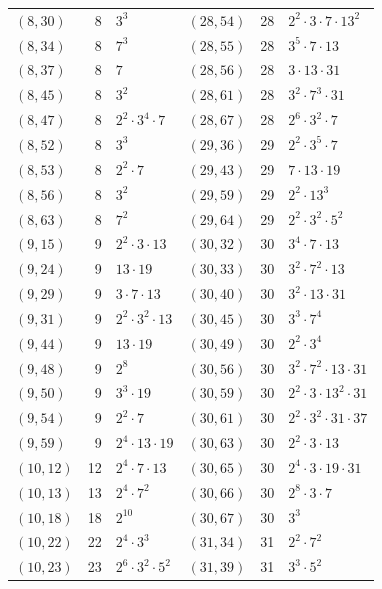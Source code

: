 \documentclass[11pt]{article}
\begin{document}
\begin{longtable}{@{}lrl@{\qquad}lrl@{}}
$(8,30)$ & 8 & $3^{3}$ & $(28,54)$ & 28 & $2^{2}\cdot 3\cdot 7\cdot 13^{2}$\\
$(8,34)$ & 8 & $7^{3}$ & $(28,55)$ & 28 & $3^{5}\cdot 7\cdot 13$\\
$(8,37)$ & 8 & $7$ & $(28,56)$ & 28 & $3\cdot 13\cdot 31$\\
$(8,45)$ & 8 & $3^{2}$ & $(28,61)$ & 28 & $3^{2}\cdot 7^{3}\cdot 31$\\
$(8,47)$ & 8 & $2^{2}\cdot 3^{4}\cdot 7$ & $(28,67)$ & 28 & $2^{6}\cdot 3^{2}\cdot 7$\\
$(8,52)$ & 8 & $3^{3}$ & $(29,36)$ & 29 & $2^{2}\cdot 3^{5}\cdot 7$\\
$(8,53)$ & 8 & $2^{2}\cdot 7$ & $(29,43)$ & 29 & $7\cdot 13\cdot 19$\\
$(8,56)$ & 8 & $3^{2}$ & $(29,59)$ & 29 & $2^{2}\cdot 13^{3}$\\
$(8,63)$ & 8 & $7^{2}$ & $(29,64)$ & 29 & $2^{2}\cdot 3^{2}\cdot 5^{2}$\\
$(9,15)$ & 9 & $2^{2}\cdot 3\cdot 13$ & $(30,32)$ & 30 & $3^{4}\cdot 7\cdot 13$\\
$(9,24)$ & 9 & $13\cdot 19$ & $(30,33)$ & 30 & $3^{2}\cdot 7^{2}\cdot 13$\\
$(9,29)$ & 9 & $3\cdot 7\cdot 13$ & $(30,40)$ & 30 & $3^{2}\cdot 13\cdot 31$\\
$(9,31)$ & 9 & $2^{2}\cdot 3^{2}\cdot 13$ & $(30,45)$ & 30 & $3^{3}\cdot 7^{4}$\\
$(9,44)$ & 9 & $13\cdot 19$ & $(30,49)$ & 30 & $2^{2}\cdot 3^{4}$\\
$(9,48)$ & 9 & $2^{8}$ & $(30,56)$ & 30 & $3^{2}\cdot 7^{2}\cdot 13\cdot 31$\\
$(9,50)$ & 9 & $3^{3}\cdot 19$ & $(30,59)$ & 30 & $2^{2}\cdot 3\cdot 13^{2}\cdot 31$\\
$(9,54)$ & 9 & $2^{2}\cdot 7$ & $(30,61)$ & 30 & $2^{2}\cdot 3^{2}\cdot 31\cdot 37$\\
$(9,59)$ & 9 & $2^{4}\cdot 13\cdot 19$ & $(30,63)$ & 30 & $2^{2}\cdot 3\cdot 13$\\
$(10,12)$ & 12 & $2^{4}\cdot 7\cdot 13$ & $(30,65)$ & 30 & $2^{4}\cdot 3\cdot 19\cdot 31$\\
$(10,13)$ & 13 & $2^{4}\cdot 7^{2}$ & $(30,66)$ & 30 & $2^{8}\cdot 3\cdot 7$\\
$(10,18)$ & 18 & $2^{10}$ & $(30,67)$ & 30 & $3^{3}$\\
$(10,22)$ & 22 & $2^{4}\cdot 3^{3}$ & $(31,34)$ & 31 & $2^{2}\cdot 7^{2}$\\
$(10,23)$ & 23 & $2^{6}\cdot 3^{2}\cdot 5^{2}$ & $(31,39)$ & 31 & $3^{3}\cdot 5^{2}$\\

\end{longtable}
\end{document}
